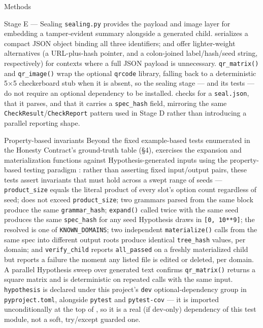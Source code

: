 \documentclass[
  ignorenonframetext,
]{beamer}
\begin{document}
\begin{frame}{Methods}
\begin{block}{Stage E --- Sealing}
\protect{}\label{stage-e-sealing}
\texttt{sealing.py} provides the payload and image layer for embedding a
tamper-evident summary alongside a generated child.
 serializes a
compact JSON object binding all three identifiers;
 and 
offer lighter-weight alternatives (a URL-plus-hash pointer, and a
colon-joined label/hash/seed string, respectively) for contexts where a
full JSON payload is unnecessary. \texttt{qr\_matrix()} and
\texttt{qr\_image()} wrap the optional \texttt{qrcode} library, falling
back to a deterministic 5×5 checkerboard stub when it is absent, so the
sealing stage --- and its tests --- do not require an optional
dependency to be installed.  checks
for a \texttt{seal.json}, that it parses, and that it carries a
\texttt{spec\_hash} field, mirroring the same
\texttt{CheckResult}/\texttt{CheckReport} pattern used in Stage D rather
than introducing a parallel reporting shape.
\end{block}

\begin{block}{Property-based invariants}
\protect{}\label{property-based-invariants}
Beyond the fixed example-based tests enumerated in the Honesty
Contract's ground-truth table (§4),
 exercises the expansion and
materialization functions against Hypothesis-generated inputs using the
property-based testing paradigm : rather than asserting fixed input/output
pairs, these tests assert invariants that must hold across a swept range
of seeds --- \texttt{product\_size} equals the literal product of every
slot's option count regardless of seed;
 does not exceed
\texttt{product\_size}; two grammars parsed from the same block produce
the same \texttt{grammar\_hash}; \texttt{expand()} called twice with the
same seed produces the same \texttt{spec\_hash} for any seed Hypothesis
draws in \texttt{{[}0,\ 10**9{]}}; the resolved
 is one of \texttt{KNOWN\_DOMAINS}; two
independent \texttt{materialize()} calls from the same spec into
different output roots produce identical \texttt{tree\_hash} values, per
domain; and \texttt{verify\_child} reports \texttt{all\_passed} on a
freshly materialized child but reports a failure the moment any listed
file is edited or deleted, per domain. A parallel Hypothesis sweep over
generated text confirms \texttt{qr\_matrix()} returns a square matrix
and is deterministic on repeated calls with the same input.
\texttt{hypothesis} is declared under this project's \texttt{dev}
optional-dependency group in \texttt{pyproject.toml}, alongside
\texttt{pytest} and \texttt{pytest-cov} --- it is imported
unconditionally at the top of , so
it is a real (if dev-only) dependency of this test module, not a soft,
try/except guarded one.
\end{block}


\end{frame}
\end{document}
